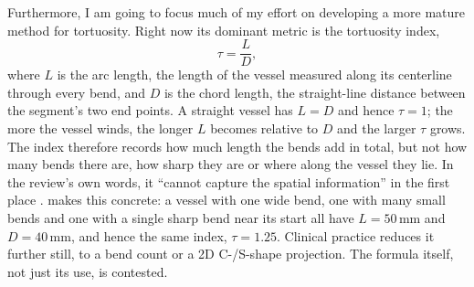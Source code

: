 Furthermore, I am going to focus much of my effort on developing a more mature method for
tortuosity. Right now its dominant metric is the tortuosity index,
%
\begin{equation}
  \tau = \frac{L}{D},
  \label{eq:tortuosity-index}
\end{equation}
%
where $L$ is the arc length, the length of the vessel measured along its centerline through every
bend, and $D$ is the chord length, the straight-line distance between the segment's two end points.
A straight vessel has $L = D$ and hence $\tau = 1$; the more the vessel winds, the longer $L$
becomes relative to $D$ and the larger $\tau$ grows. The index therefore records how much length
the bends add in total, but not how many bends there are, how sharp they are or where along the
vessel they lie. In the review's own words, it ``cannot capture the spatial information'' in the
first place \cite{shen2026geometry}.  makes this concrete: a
vessel with one wide bend, one with many small bends and one with a single sharp bend near its start
all have $L = 50$\,mm and $D = 40$\,mm, and hence the same index, $\tau = 1.25$.
Clinical practice reduces it further still, to a bend count or a 2D C-/S-shape projection.
The formula itself, not just its use, is contested.

